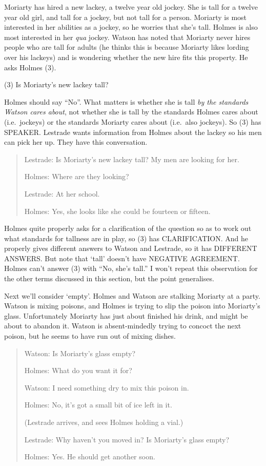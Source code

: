 \documentclass[
  11pt,
  letterpaper,
  DIV=11,
  numbers=noendperiod,
  twoside]{scrartcl}
\begin{document}
Moriarty has hired a new lackey, a twelve year old jockey. She is tall
for a twelve year old girl, and tall for a jockey, but not tall for a
person. Moriarty is most interested in her abilities as a jockey, so he
worries that she's tall. Holmes is also most interested in her
\emph{qua} jockey. Watson has noted that Moriarty never hires people who
are tall for adults (he thinks this is because Moriarty likes lording
over his lackeys) and is wondering whether the new hire fits this
property. He asks Holmes (3).

(3) Is Moriarty's new lackey tall?

Holmes should say ``No''. What matters is whether she is tall \emph{by
the standards Watson cares about}, not whether she is tall by the
standards Holmes cares about (i.e.~jockeys) or the standards Moriarty
cares about (i.e.~also jockeys). So (3) has SPEAKER. Lestrade wants
information from Holmes about the lackey so his men can pick her up.
They have this conversation.

\begin{quote}
Lestrade: Is Moriarty's new lackey tall? My men are looking for her.

Holmes: Where are they looking?

Lestrade: At her school.

Holmes: Yes, she looks like she could be fourteen or fifteen.
\end{quote}

Holmes quite properly asks for a clarification of the question so as to
work out what standards for tallness are in play, so (3) has
CLARIFICATION. And he properly gives different answers to Watson and
Lestrade, so it has DIFFERENT ANSWERS. But note that `tall' doesn't have
NEGATIVE AGREEMENT. Holmes can't answer (3) with ``No, she's tall.'' I
won't repeat this observation for the other terms discussed in this
section, but the point generalises.

Next we'll consider `empty'. Holmes and Watson are stalking Moriarty at
a party. Watson is mixing poisons, and Holmes is trying to slip the
poison into Moriarty's glass. Unfortunately Moriarty has just about
finished his drink, and might be about to abandon it. Watson is
absent-mindedly trying to concoct the next poison, but he seems to have
run out of mixing dishes.

\begin{quote}
Watson: Is Moriarty's glass empty?

Holmes: What do you want it for?

Watson: I need something dry to mix this poison in.

Holmes: No, it's got a small bit of ice left in it.

(Lestrade arrives, and sees Holmes holding a vial.)

Lestrade: Why haven't you moved in? Is Moriarty's glass empty?

Holmes: Yes. He should get another soon.
\end{quote}
\end{document}
